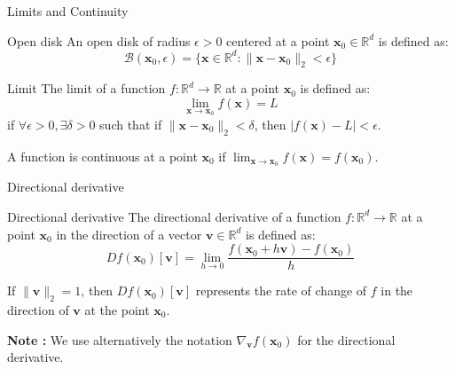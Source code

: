 \documentclass[aspectratio=1610]{beamer}
\begin{document}
\begin{frame}{Limits and Continuity}
  \begin{block}{Open disk}
    An open disk of radius $\epsilon > 0$ centered at a point $\mathbf{x}_0 \in \mathbb{R}^d$ is defined as:
    $$\mathcal{B}(\mathbf{x}_0, \epsilon) = \{\mathbf{x} \in \mathbb{R}^d : \|\mathbf{x} - \mathbf{x}_0\|_2 < \epsilon\}$$
  \end{block}

  \begin{block}{Limit}
    The limit of a function $f:\mathbb{R}^d \to \mathbb{R}$ at a point $\mathbf{x}_0$ is defined as:
    $$\lim_{\mathbf{x} \to \mathbf{x}_0} f(\mathbf{x}) = L$$
    if $\forall \epsilon > 0, \exists \delta > 0$ such that if $\|\mathbf{x} - \mathbf{x}_0\|_2 < \delta$, then $|f(\mathbf{x}) - L| < \epsilon$.
  \end{block}

  A function is continuous at a point $\mathbf{x}_0$ if $\lim_{\mathbf{x} \to \mathbf{x}_0} f(\mathbf{x}) = f(\mathbf{x}_0)$.
\end{frame}

\begin{frame}{Directional derivative}

  \begin{block}{Directional derivative}
    The directional derivative of a function $f:\mathbb{R}^d \to \mathbb{R}$ at a point $\mathbf{x}_0$ in the direction of a vector $\mathbf{v} \in \mathbb{R}^d$ is defined as:
    $$Df(\mathbf{x}_0)[\mathbf{v}] = \lim_{h \to 0} \frac{f(\mathbf{x}_0 + h\mathbf{v}) - f(\mathbf{x}_0)}{h}$$
  \end{block}

  If $\|\mathbf{v}\|_2 = 1$, then $Df(\mathbf{x}_0)[\mathbf{v}]$ represents the rate of change of $f$ in the direction of $\mathbf{v}$ at the point $\mathbf{x}_0$.
 
  \textbf{Note :} We use alternatively the notation $\nabla_{\mathbf{v}}f(\mathbf{x}_0)$ for the directional derivative.

\end{frame}
\end{document}
